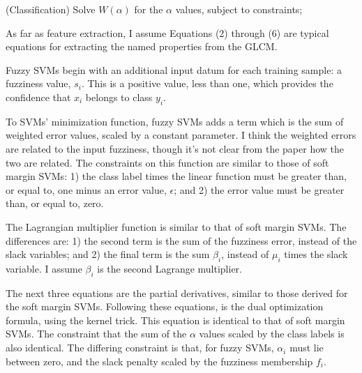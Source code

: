 \documentclass[11pt]{article}
\begin{document}
\begin{description}[leftmargin=0in]
        \begin{algorithm}
            \Begin(Classification)
            {
                {
                    Solve $W(\alpha)$ for the $\alpha$ values, subject to
                    constraints;
                }
            }
        \end{algorithm}

        As far as feature extraction, I assume Equations (2) through (6) are
        typical equations for extracting the named properties from the GLCM.

        Fuzzy SVMs begin with an additional input datum for each training
        sample: a fuzziness value, $s_i$. This is a positive value, less than
        one, which provides the confidence that $x_i$ belongs to class $y_i$.

        To SVMs' minimization function, fuzzy SVMs adds a term which is the sum
        of weighted error values, scaled by a constant parameter. I think the
        weighted errors are related to the input fuzziness, though it's not
        clear from the paper how the two are related. The constraints on this
        function are similar to those of soft margin SVMs: 1) the class label
        times the linear function must be greater than, or equal to, one minus
        an error value, $\epsilon$; and 2) the error value must be greater than,
        or equal to, zero.

        The Lagrangian multiplier function is similar to that of soft margin
        SVMs. The differences are: 1) the second term is the sum of the
        fuzziness error, instead of the slack variables; and 2) the final term
        is the sum $\beta_i$, instead of $\mu_i$ times the slack variable. I
        assume $\beta_i$ is the second Lagrange multiplier.

        The next three equations are the partial derivatives, similar to those
        derived for the soft margin SVMs. Following these equations, is the dual
        optimization formula, using the kernel trick. This equation is identical
        to that of soft margin SVMs. The constraint that the sum of the $\alpha$
        values scaled by the class labels is also identical. The differing
        constraint is that, for fuzzy SVMs, $\alpha_i$ must lie between zero,
        and the slack penalty scaled by the fuzziness membership $f_i$.


\end{description}
\end{document}
